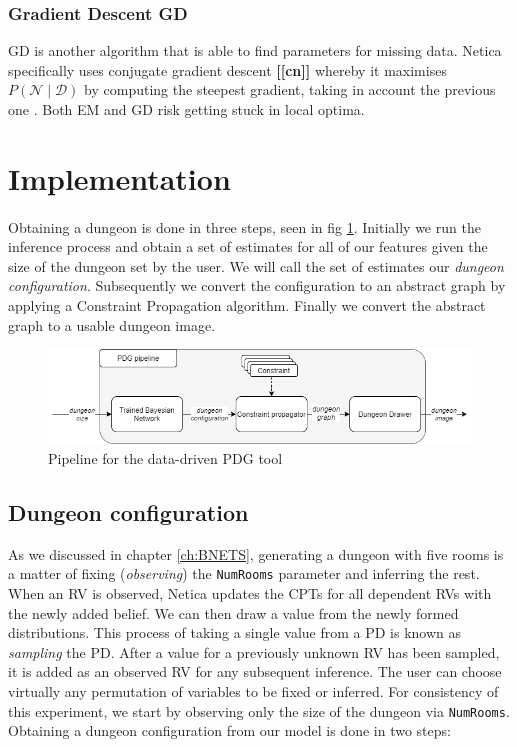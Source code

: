 \documentclass{UoYCSproject}
\begin{document}
\subsubsection{Gradient Descent GD}
GD is another algorithm that is able to find parameters for missing data. Netica specifically uses conjugate gradient descent \textbf{[[cn]]} whereby it maximises \(P(\mathcal{N} \mid \mathcal{D})\) by computing the steepest gradient, taking in account the previous one \parencite[p47]{neticaCman}. Both EM and GD risk getting stuck in local optima.

\section{Implementation}
\label{sec:implementation}
\paragraph{}
Obtaining a dungeon is done in three steps, seen in fig \ref{fig:PDGPipeline}. Initially we run the inference process and obtain a set of estimates for all of our features given the size of the dungeon set by the user. We will call the set of estimates our \textit{dungeon configuration}. Subsequently we convert the configuration to an abstract graph by applying a Constraint Propagation algorithm. Finally we convert the abstract graph to a usable dungeon image.

\begin{figure}[htb]
  \centering
    \includegraphics[width=\textwidth]{figures/BPDG_flow.png}
    \caption{Pipeline for the data-driven PDG tool}
  \label{fig:PDGPipeline}
\end{figure}

\subsection{Dungeon configuration}
As we discussed in chapter \ref{ch:BNETS}, generating a dungeon with five rooms is a matter of fixing (\textit{observing}) the \texttt{NumRooms} parameter and inferring the rest. When an RV is observed, Netica updates the CPTs for all dependent RVs with the newly added belief. We can then draw a value from the newly formed distributions. This process of taking a single value from a PD is known as \textit{sampling} the PD. After a value for a previously unknown RV has been sampled, it is added as an observed RV for any subsequent inference. The user can choose virtually any permutation of variables to be fixed or inferred. For consistency of this experiment, we start by observing only the size of the dungeon via \texttt{NumRooms}. Obtaining a dungeon configuration from our model is done in two steps:
\end{document}
